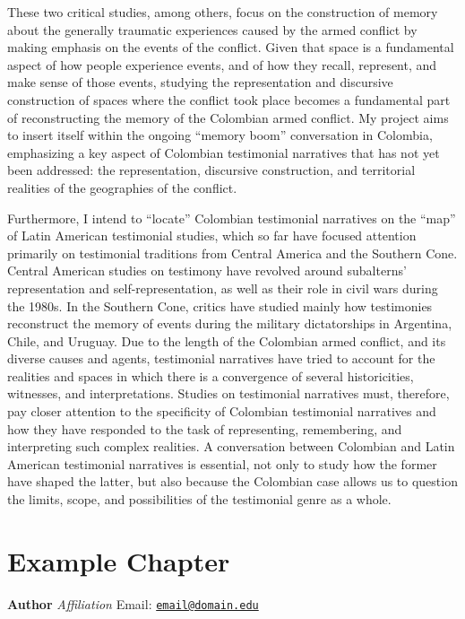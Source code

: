 \documentclass[
  11pt,
,
onecolumn,
openany
]{book}
\begin{document}
These two critical studies, among others, focus on the construction of memory
about the generally traumatic experiences caused by the armed conflict by
making emphasis on the events of the conflict. Given that space is a
fundamental aspect of how people experience events, and of how they recall,
represent, and make sense of those events, studying the representation and
discursive construction of spaces where the conflict took place becomes a
fundamental part of reconstructing the memory of the Colombian armed conflict.
My project aims to insert itself within the ongoing ``memory boom''
conversation in Colombia, emphasizing a key aspect of Colombian testimonial
narratives that has not yet been addressed: the representation, discursive
construction, and territorial realities of the geographies of the conflict.

Furthermore, I intend to ``locate'' Colombian testimonial narratives on the
``map'' of Latin American testimonial studies, which so far have focused
attention primarily on testimonial traditions from Central America and the
Southern Cone. Central American studies on testimony have revolved around
subalterns' representation and self-representation, as well as their role in
civil wars during the 1980s. In the Southern Cone, critics have studied mainly
how testimonies reconstruct the memory of events during the military
dictatorships in Argentina, Chile, and Uruguay. Due to the length of the
Colombian armed conflict, and its diverse causes and agents, testimonial
narratives have tried to account for the realities and spaces in which there
is a convergence of several historicities, witnesses, and interpretations.
Studies on testimonial narratives must, therefore, pay closer attention to the
specificity of Colombian testimonial narratives and how they have responded to
the task of representing, remembering, and interpreting such complex
realities. A conversation between Colombian and Latin American testimonial
narratives is essential, not only to study how the former have shaped the
latter, but also because the Colombian case allows us to question the limits,
scope, and possibilities of the testimonial genre as a whole.

\hypertarget{example-chapter}{%
\chapter{Example Chapter}\label{example-chapter}}

\textbf{Author} \emph{Affiliation} Email:
\href{mailto:email@domain.edu}{\nolinkurl{email@domain.edu}}
\end{document}

